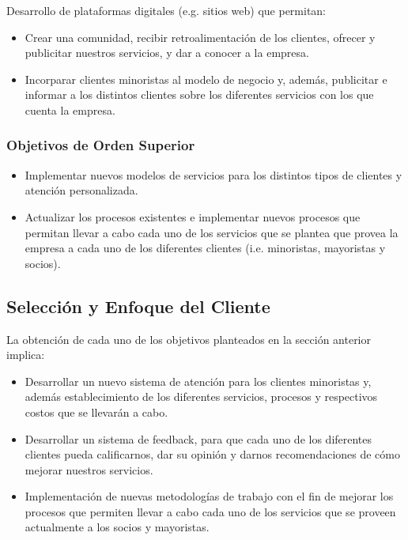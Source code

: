 Desarrollo de plataformas digitales (e.g. sitios web) que permitan:

\begin{itemize}
	\item Crear una comunidad, recibir retroalimentación de los clientes, ofrecer y
	      publicitar nuestros servicios, y dar a conocer a la empresa.

	\item Incorparar clientes minoristas al modelo de negocio y, además, publicitar
	      e informar a los distintos clientes sobre los diferentes servicios con los que
	      cuenta la empresa.
\end{itemize}

\subsubsection{Objetivos de Orden Superior}

\begin{itemize}
	\item Implementar nuevos modelos de servicios para los distintos tipos de clientes
	      y atención personalizada.

	\item Actualizar los procesos existentes e implementar nuevos procesos que permitan
	      llevar a cabo cada uno de los servicios que se plantea que provea la empresa
	      a cada uno de los diferentes clientes (i.e. minoristas, mayoristas y socios).
\end{itemize}

\subsection{Selección y Enfoque del Cliente}

La obtención de cada uno de los objetivos planteados en la sección anterior
implica:

\begin{itemize}
	\item Desarrollar un nuevo sistema de atención para los clientes minoristas y,
	      además establecimiento de los diferentes servicios, procesos y respectivos costos
	      que se llevarán a cabo.

	\item Desarrollar un sistema de feedback, para que cada uno de los diferentes
	      clientes pueda calificarnos, dar su opinión y darnos recomendaciones de cómo
	      mejorar nuestros servicios.

	\item Implementación de nuevas metodologías de trabajo con el fin de mejorar los
	      procesos que permiten llevar a cabo cada uno de los servicios que se proveen
	      actualmente a los socios y mayoristas.
\end{itemize}

